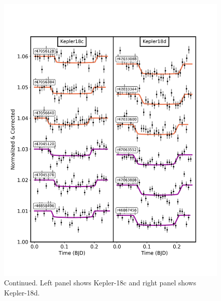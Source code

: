 \begin{subappendices}
\addtocounter{figure}{-1}
\begin{figure}
  \includegraphics[trim={0 2cm 0 0},clip,width=\textwidth]{CorrectedLighctuvesPLDKepler18_circ_fixaincrp.pdf}
  \caption{Continued. Left panel shows Kepler-18c and right panel shows Kepler-18d.}
  \label{P4:fig:normlcK18}
\end{figure}


\end{subappendices}
